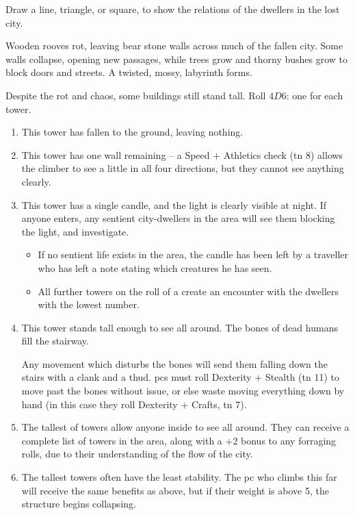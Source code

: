\begin{multicols}{2}
Draw a line, triangle, or square, to show the relations of the dwellers in the lost city.


Wooden rooves rot, leaving bear stone walls across much of the fallen city.
Some walls collapse, opening new passages, while trees grow and thorny bushes grow to block doors and streets.
A twisted, mossy, labyrinth forms.

Despite the rot and chaos, some buildings still stand tall.
Roll $4D6$: one for each tower.

\begin{enumerate}
  \item
  This tower has fallen to the ground, leaving nothing.
  \item
  This tower has one wall remaining -- a Speed + Athletics check (\gls{tn} 8) allows the climber to see a little in all four directions, but they cannot see anything clearly.
  \item
  This tower has a single candle, and the light is clearly visible at night.
  If anyone enters, any sentient city-dwellers in the area will see them blocking the light, and investigate.
  \begin{itemize}
    \item
    If no sentient life exists in the area, the candle has been left by a traveller who has left a note stating which creatures he has seen.
    \item
    All further towers on the roll of a  create an encounter with the dwellers with the lowest number.
  \end{itemize}
  \item
  This tower stands tall enough to see all around.
  The bones of dead humans fill the stairway.

  Any movement which disturbs the bones will send them falling down the stairs with a clank and a thud.
  \Glspl{pc} must roll Dexterity + Stealth (\gls{tn} 11) to move past the bones without issue, or else waste  moving everything down by hand (in this case they roll Dexterity + Crafts, \gls{tn} 7).
  \item
  The tallest of towers allow anyone inside to see all around.
  They can receive a complete list of towers in the area, along with a +2 bonus to any forraging rolls, due to their understanding of the flow of the city.
  \item
  The tallest towers often have the least stability.
  The \gls{pc} who climbs this far will receive the same benefits as above, but if their \gls{weight} is above 5, the structure begins collapsing.


\end{enumerate}
\end{multicols}
